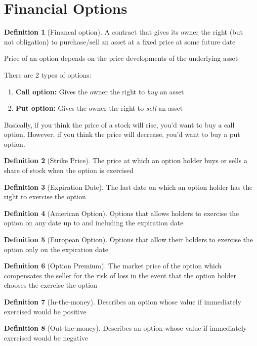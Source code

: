 \documentclass[11pt]{article}
\theoremstyle{definition}
\newtheorem*{definition}{Definition}
\begin{document}
\section{Financial Options}
\begin{definition}[Financal option]
    A contract that gives its owner the right (but not obligation) to purchase/sell an asset at a fixed price at some future date
    \item Price of an option depends on the price developments of the underlying asset
\end{definition}
There are 2 types of options:
\begin{enumerate}
    \item \textbf{Call option:} Gives the owner the right to \textit{buy} an asset
    \item \textbf{Put option:} Gives the owner the right to \textit{sell} an asset
\end{enumerate}
Basically, if you think the price of a stock will rise, you'd want to buy a call option. However, if you think the price will decrease, you'd want to buy a put option.
\begin{definition}[Strike Price]
    The price at which an option holder buys or sells a share of stock when the option is exercised
\end{definition}
\begin{definition}[Expiration Date]
    The last date on which an option holder has the right to exercise the option
\end{definition}
\begin{definition}[American Option]
    Options that allows holders to exercise the option on any date up to and including the expiration date
\end{definition}
\begin{definition}[European Option]
    Options that allow their holders to exercise the option only on the expiration date
\end{definition}
\begin{definition}[Option Premium]
    The market price of the option which compensates the seller for the risk of loss in the event that the option holder chooses the exercise the option
\end{definition}
\begin{definition}[In-the-money]
    Describes an option whose value if immediately exercised would be positive
\end{definition}
\begin{definition}[Out-the-money]
    Describes an option whose value if immediately exercised would be negative
\end{definition}
\end{document}
